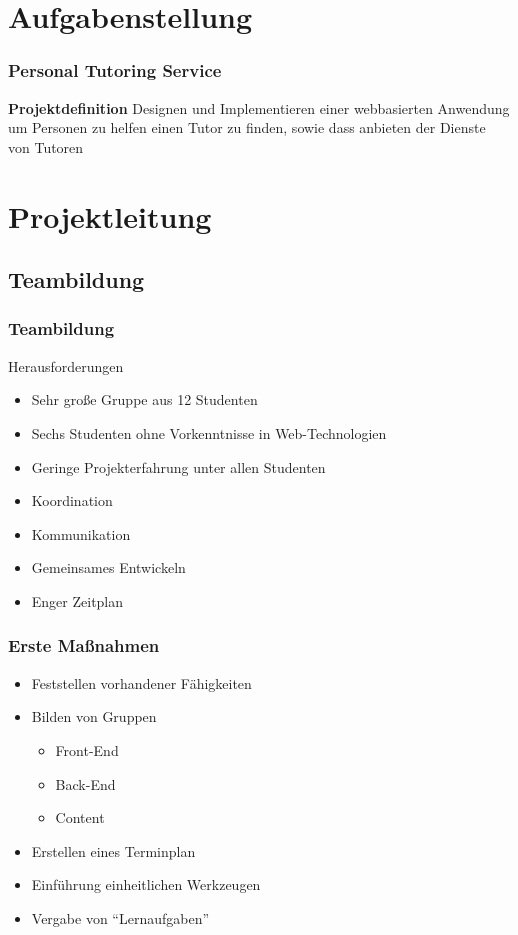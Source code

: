 \section{Aufgabenstellung} 
\begin{frame}
  \frametitle{Personal Tutoring Service} 
	\begin{block}{\textbf{Projektdefinition}}
	  {\small Designen und Implementieren einer webbasierten Anwendung um Personen zu helfen einen Tutor zu finden, sowie dass anbieten der Dienste von Tutoren}
	\end{block}
\end{frame}

\section{Projektleitung} 
\subsection{Teambildung}

\begin{frame} 
  \frametitle{Teambildung}
  \begin{block}{Herausforderungen}
    \begin{itemize}
      \item Sehr große Gruppe aus 12 Studenten
      \item Sechs Studenten ohne Vorkenntnisse in Web-Technologien
      \item Geringe Projekterfahrung unter allen Studenten
      \item Koordination
      \item Kommunikation
      \item Gemeinsames Entwickeln
      \item Enger Zeitplan
    \end{itemize}
  \end{block}
\end{frame}

\begin{frame} 
  \frametitle{Erste Maßnahmen}
    \begin{itemize}
      \item Feststellen vorhandener Fähigkeiten
      \item Bilden von Gruppen
      \begin{itemize}
        \item Front-End
        \item Back-End
        \item Content
      \end{itemize}
      \item Erstellen eines Terminplan
      \item Einführung einheitlichen Werkzeugen
      \item Vergabe von ``Lernaufgaben''
    \end{itemize}
\end{frame}

